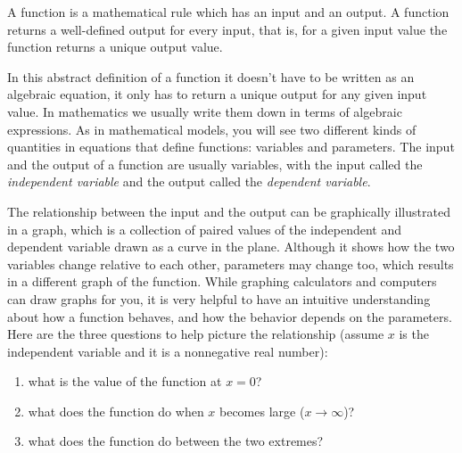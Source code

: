 \documentclass[
  letterpaper,
  DIV=11,
  numbers=noendperiod]{scrreprt}
\providecommand{\tightlist}{%
  \setlength{\itemsep}{0pt}\setlength{\parskip}{0pt}}\usepackage{longtable,booktabs,array}
\begin{document}
\begin{tcolorbox}[enhanced jigsaw, coltitle=black, arc=.35mm, opacitybacktitle=0.6, breakable, bottomtitle=1mm, toptitle=1mm, titlerule=0mm, colback=white, leftrule=.75mm, rightrule=.15mm, colframe=quarto-callout-note-color-frame, colbacktitle=quarto-callout-note-color!10!white, opacityback=0, title=\textcolor{quarto-callout-note-color}{\faInfo}\hspace{0.5em}{Definition}, left=2mm, toprule=.15mm, bottomrule=.15mm]

A function is a mathematical rule which has an input and an output. A
function returns a well-defined output for every input, that is, for a
given input value the function returns a unique output value.

\end{tcolorbox}

In this abstract definition of a function it doesn't have to be written
as an algebraic equation, it only has to return a unique output for any
given input value. In mathematics we usually write them down in terms of
algebraic expressions. As in mathematical models, you will see two
different kinds of quantities in equations that define functions:
variables and parameters. The input and the output of a function are
usually variables, with the input called the
 \emph{independent variable} and the output
called the  \emph{dependent variable}.

The relationship between the input and the output can be graphically
illustrated in a  graph, which is a collection of
paired values of the independent and dependent variable drawn as a curve
in the plane. Although it shows how the two variables change relative to
each other, parameters may change too, which results in a different
graph of the function. While graphing calculators and computers can draw
graphs for you, it is very helpful to have an intuitive understanding
about how a function behaves, and how the behavior depends on the
parameters. Here are the three questions to help picture the
relationship (assume \(x\) is the independent variable and it is a
nonnegative real number):

\begin{enumerate}
\def\labelenumi{\arabic{enumi}.}
\tightlist
\item
  what is the value of the function at \(x=0\)?
\item
  what does the function do when \(x\) becomes large (\(x \to \infty\))?
\item
  what does the function do between the two extremes?
\end{enumerate}
\end{document}
